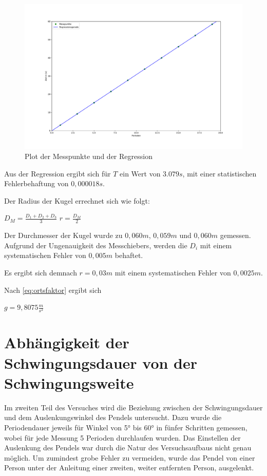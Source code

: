 \begin{figure}[h!]
    \centering
    \includegraphics[scale=0.4]{./Pendel/Protokoll/fig/Fadenpendel_Regression.pdf}
    \caption{Plot der Messpunkte und der Regression}
    \label{fig:Faden_Reg1}
\end{figure}

Aus der Regression ergibt sich für $T$ ein Wert von $3.079s$, mit einer statistischen Fehlerbehaftung von $0,000018s$.

Der Radius der Kugel errechnet sich wie folgt:

$D_M = \frac{D_1 + D_2 + D_3}{3}$
$r = \frac{D_M}{2}$

Der Durchmesser der Kugel wurde zu $0,060m$, $0,059m$ und $0,060m$ gemessen.
Aufgrund der Ungenauigkeit des Messchiebers, werden die $D_i$ mit einem systematischen Fehler von $0,005m$ behaftet.

Es ergibt sich demnach $r = 0,03m$ mit einem systematischen Fehler von $0,0025m$.

Nach \ref{eq:ortsfaktor} ergibt sich

$g = 9,8075\frac{m}{s^2}$

\section{Abhängigkeit der Schwingungsdauer von der Schwingungsweite}

Im zweiten Teil des Versuches wird die Beziehung zwischen der Schwingungsdauer und dem Auslenkungswinkel des Pendels untersucht.
Dazu wurde die Periodendauer jeweils für Winkel von 5° bis 60° in fünfer Schritten gemessen,
wobei für jede Messung 5 Perioden durchlaufen wurden.
Das Einstellen der Auslenkung des Pendels war durch die Natur des Versuchsaufbaus nicht genau möglich.
Um zumindest grobe Fehler zu vermeiden, wurde das Pendel von einer Person unter der Anleitung einer zweiten, weiter entfernten Person, ausgelenkt.

